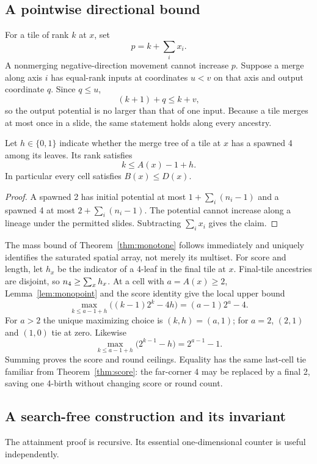\subsection{A pointwise directional bound}

For a tile of rank $k$ at $x$, set
\[
 p=k+\sum_i x_i.
\]
A nonmerging negative-direction movement cannot increase $p$.  Suppose a
merge along axis $i$ has equal-rank inputs at coordinates $u<v$ on that
axis and output coordinate $q$.  Since $q\le u$,
\[
 (k+1)+q\le k+v,
\]
so the output potential is no larger than that of one input.  Because a
tile merges at most once in a slide, the same statement holds along every
ancestry.

\begin{lemma}\label{lem:monopoint}
Let $h\in\{0,1\}$ indicate whether the merge tree of a tile at $x$ has a
spawned 4 among its leaves.  Its rank satisfies
\[
 k\le A(x)-1+h.
\]
In particular every cell satisfies $B(x)\le D(x)$.
\end{lemma}
\begin{proof}
A spawned 2 has initial potential at most
$1+\sum_i(n_i-1)$ and a spawned 4 at most
$2+\sum_i(n_i-1)$.  The potential cannot increase along a lineage under
the permitted slides.  Subtracting $\sum_i x_i$ gives the claim.
\end{proof}

The mass bound of Theorem~\ref{thm:monotone} follows immediately and
uniquely identifies the saturated spatial array, not merely its multiset.
For score and length, let $h_x$ be the indicator of a 4-leaf in the final
tile at $x$.  Final-tile ancestries are disjoint, so
$n_4\ge\sum_xh_x$.  At a cell with $a=A(x)\ge2$, Lemma~\ref{lem:monopoint}
and the score identity give the local upper bound
\[
 \max_{k\le a-1+h}\big((k-1)2^k-4h\big)=(a-1)2^a-4.
\]
For $a>2$ the unique maximizing choice is $(k,h)=(a,1)$; for $a=2$,
$(2,1)$ and $(1,0)$ tie at zero.  Likewise
\[
 \max_{k\le a-1+h}\big(2^{k-1}-h\big)=2^{a-1}-1.
\]
Summing proves the score and round ceilings.  Equality has the same
last-cell tie familiar from Theorem~\ref{thm:score}: the far-corner 4 may
be replaced by a final 2, saving one 4-birth without changing score or
round count.

\subsection{A search-free construction and its invariant}

The attainment proof is recursive.  Its essential one-dimensional
counter is useful independently.

